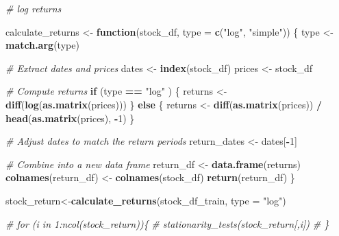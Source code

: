 \documentclass[
]{article}
\newenvironment{Shaded}{\begin{snugshade}}{\end{snugshade}}
\newcommand{\AttributeTok}[1]{\textcolor[rgb]{0.13,0.29,0.53}{#1}}
\newcommand{\CommentTok}[1]{\textcolor[rgb]{0.56,0.35,0.01}{\textit{#1}}}
\newcommand{\ControlFlowTok}[1]{\textcolor[rgb]{0.13,0.29,0.53}{\textbf{#1}}}
\newcommand{\DecValTok}[1]{\textcolor[rgb]{0.00,0.00,0.81}{#1}}
\newcommand{\FunctionTok}[1]{\textcolor[rgb]{0.13,0.29,0.53}{\textbf{#1}}}
\newcommand{\NormalTok}[1]{#1}
\newcommand{\OtherTok}[1]{\textcolor[rgb]{0.56,0.35,0.01}{#1}}
\newcommand{\SpecialCharTok}[1]{\textcolor[rgb]{0.81,0.36,0.00}{\textbf{#1}}}
\newcommand{\StringTok}[1]{\textcolor[rgb]{0.31,0.60,0.02}{#1}}
\begin{document}
\begin{Shaded}
\begin{Highlighting}[]
\CommentTok{\# log returns}


\NormalTok{calculate\_returns }\OtherTok{\textless{}{-}} \ControlFlowTok{function}\NormalTok{(stock\_df, }\AttributeTok{type =} \FunctionTok{c}\NormalTok{(}\StringTok{"log"}\NormalTok{, }\StringTok{"simple"}\NormalTok{)) \{}
\NormalTok{  type }\OtherTok{\textless{}{-}} \FunctionTok{match.arg}\NormalTok{(type)}

  \CommentTok{\# Extract dates and prices}
\NormalTok{  dates }\OtherTok{\textless{}{-}} \FunctionTok{index}\NormalTok{(stock\_df)}
\NormalTok{  prices }\OtherTok{\textless{}{-}}\NormalTok{ stock\_df}

  \CommentTok{\# Compute returns}
  \ControlFlowTok{if}\NormalTok{ (type }\SpecialCharTok{==} \StringTok{"log"}\NormalTok{ ) \{}
\NormalTok{    returns }\OtherTok{\textless{}{-}} \FunctionTok{diff}\NormalTok{(}\FunctionTok{log}\NormalTok{(}\FunctionTok{as.matrix}\NormalTok{(prices)))}
\NormalTok{  \} }\ControlFlowTok{else}\NormalTok{ \{}
\NormalTok{    returns }\OtherTok{\textless{}{-}} \FunctionTok{diff}\NormalTok{(}\FunctionTok{as.matrix}\NormalTok{(prices)) }\SpecialCharTok{/} \FunctionTok{head}\NormalTok{(}\FunctionTok{as.matrix}\NormalTok{(prices), }\SpecialCharTok{{-}}\DecValTok{1}\NormalTok{)}
\NormalTok{  \}}

  \CommentTok{\# Adjust dates to match the return periods}
\NormalTok{  return\_dates }\OtherTok{\textless{}{-}}\NormalTok{ dates[}\SpecialCharTok{{-}}\DecValTok{1}\NormalTok{]}

  \CommentTok{\# Combine into a new data frame}
\NormalTok{  return\_df }\OtherTok{\textless{}{-}} \FunctionTok{data.frame}\NormalTok{(returns)}
  \FunctionTok{colnames}\NormalTok{(return\_df) }\OtherTok{\textless{}{-}} \FunctionTok{colnames}\NormalTok{(stock\_df)}
  \FunctionTok{return}\NormalTok{(return\_df)}
\NormalTok{\}}


\NormalTok{stock\_return}\OtherTok{\textless{}{-}}\FunctionTok{calculate\_returns}\NormalTok{(stock\_df\_train, }\AttributeTok{type =} \StringTok{"log"}\NormalTok{)}
\end{Highlighting}
\end{Shaded}

\begin{Shaded}
\begin{Highlighting}[]
\CommentTok{\# for (i in 1:ncol(stock\_return))\{}
\CommentTok{\#   stationarity\_tests(stock\_return[,i])}
\CommentTok{\# \}}
\end{Highlighting}
\end{Shaded}
\end{document}
